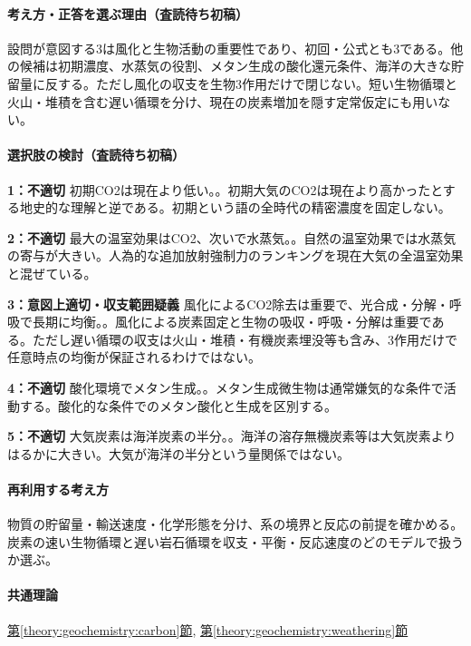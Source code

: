 \paragraph{考え方・正答を選ぶ理由（査読待ち初稿）} 設問が意図する3は風化と生物活動の重要性であり、初回・公式とも3である。他の候補は初期濃度、水蒸気の役割、メタン生成の酸化還元条件、海洋の大きな貯留量に反する。ただし風化の収支を生物3作用だけで閉じない。短い生物循環と火山・堆積を含む遅い循環を分け、現在の炭素増加を隠す定常仮定にも用いない。

\paragraph{選択肢の検討（査読待ち初稿）}\mbox{}\par

\noindent\textbf{1：不適切} 初期CO2は現在より低い。。初期大気のCO2は現在より高かったとする地史的な理解と逆である。初期という語の全時代の精密濃度を固定しない。\par

\noindent\textbf{2：不適切} 最大の温室効果はCO2、次いで水蒸気。。自然の温室効果では水蒸気の寄与が大きい。人為的な追加放射強制力のランキングを現在大気の全温室効果と混ぜている。\par

\noindent\textbf{3：意図上適切・収支範囲疑義} 風化によるCO2除去は重要で、光合成・分解・呼吸で長期に均衡。。風化による炭素固定と生物の吸収・呼吸・分解は重要である。ただし遅い循環の収支は火山・堆積・有機炭素埋没等も含み、3作用だけで任意時点の均衡が保証されるわけではない。\par

\noindent\textbf{4：不適切} 酸化環境でメタン生成。。メタン生成微生物は通常嫌気的な条件で活動する。酸化的な条件でのメタン酸化と生成を区別する。\par

\noindent\textbf{5：不適切} 大気炭素は海洋炭素の半分。。海洋の溶存無機炭素等は大気炭素よりはるかに大きい。大気が海洋の半分という量関係ではない。\par

\paragraph{再利用する考え方} 物質の貯留量・輸送速度・化学形態を分け、系の境界と反応の前提を確かめる。炭素の速い生物循環と遅い岩石循環を収支・平衡・反応速度のどのモデルで扱うか選ぶ。

\paragraph{共通理論} \hyperref[theory:geochemistry:carbon]{第\ref*{theory:geochemistry:carbon}節}, \hyperref[theory:geochemistry:weathering]{第\ref*{theory:geochemistry:weathering}節}


